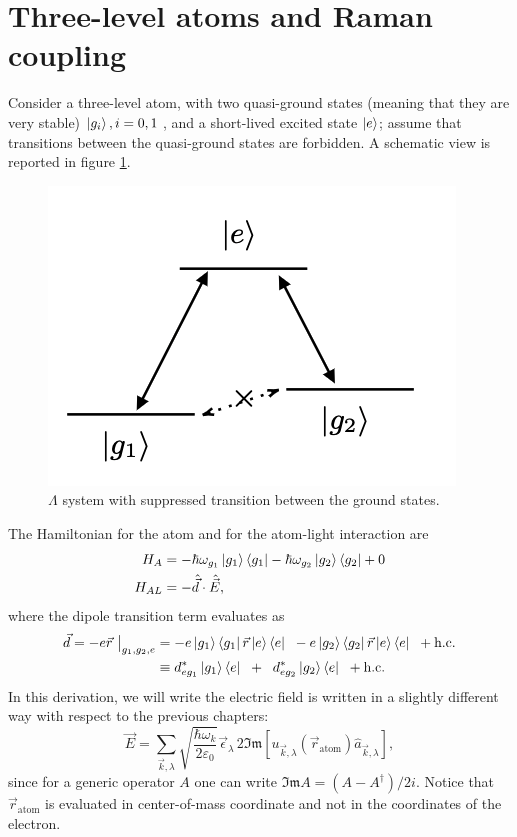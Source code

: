 \section{Three-level atoms and Raman coupling}

Consider a three-level atom, with two quasi-ground states (meaning that they are very stable) $\ket{g_i}, i = 0,1\;$, and a short-lived excited state $\ket{e}$; assume that transitions between the quasi-ground states are forbidden. A schematic view is reported in figure \ref{fig:lambda}. 
\begin{figure}[h]
\centering
    \includegraphics[width=0.3\linewidth]{images/lambda_system.png}
    \caption{$\Lambda$ system with suppressed transition between the ground states. }
    \label{fig:lambda}
\end{figure}

The Hamiltonian for the atom and for the atom-light interaction are 
\begin{align*}
H_{A} &= -\hbar \omega_{g_1} \ket{g_1}\bra{g_1} -\hbar \omega_{g_2} \ket{g_2}\bra{g_2} + 0\\
H_{AL} &= - \hat{\vec{d}} \cdot \hat{\vec{E}},
\end{align*}
where the dipole transition term evaluates as
\begin{equation*}
\begin{aligned}
{\vec{d}} = -e{\vec{r}}  ~\big\rvert_{g_1,g_2,e} & =  -e\ket{g_1}\bra{g_1}\vec{r}\ket{e}\bra{e} \;\;- e\ket{g_2}\bra{g_2}\vec{r}\ket{e}\bra{e} \;\; + \text{h.c.} \\
&\equiv d_{eg_1}^*\ket{g_1}\bra{e} \;\;+\;\; d_{eg_2}^*\ket{g_2}\bra{e} \;\; + \text{h.c}.
\end{aligned}
\end{equation*}
In this derivation, we will write the electric field is written in a slightly different way with respect to the previous chapters: 
\begin{equation*}
\vec{E} =
\sum_{\vec{k},\lambda} \sqrt{\frac{\hbar\omega_k}{2\varepsilon_0}}\vec\epsilon_{\lambda} \, 2 \mathfrak{Im} \left[u_{\vec{k},\lambda}(\vec{r}_\text{atom})\hat{a}_{\vec{k},\lambda}\right], 
\end{equation*}
since for a generic operator $A$ one can write $\mathfrak{Im} A = (A-A^\dagger)/2i$. Notice that $\vec{r}_\text{atom}$ is evaluated in center-of-mass coordinate and not in the coordinates of the electron. 

